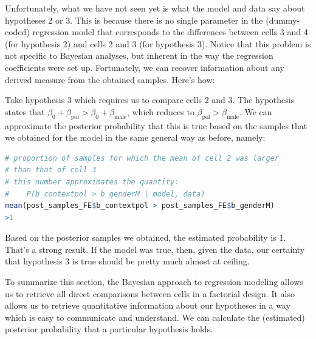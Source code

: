 \documentclass[nobib]{tufte-handout}
\begin{document}
Unfortunately, what we have not seen yet is what the model and data say about hypotheses 2 or 3. This is because there is no single parameter in the (dummy-coded) regression model that corresponds to the differences between cells 3 and 4 (for hypothesis 2) and cells 2 and 3 (for hypothesis 3). Notice that this problem is not specific to Bayesian analyses, but inherent in the way the regression coefficients were set up.
%
%
Fortunately, we can recover information about any derived measure from the obtained samples. Here's how:

Take hypothesis 3 which requires us to compare cells 2 and 3. The hypothesis states that
$\beta_0 + \beta_{\text{pol}} > \beta_0 + \beta_{\text{male}}$, which reduces to
$\beta_{\text{pol}} > \beta_{\text{male}}$. We can approximate the posterior probability that
this is true based on the samples that we obtained for the model in the same general way as
before, namely:

\bigskip

\begin{minipage}[]{1.1\textwidth}
\begin{lstlisting}[language=R]
# proportion of samples for which the mean of cell 2 was larger 
# than that of cell 3 
# this number approximates the quantity:
#    P(b_contextpol > b_genderM | model, data)
mean(post_samples_FE$b_contextpol > post_samples_FE$b_genderM)
>1
\end{lstlisting}
\end{minipage}

Based on the posterior samples we obtained, the estimated probability is 1. That's a strong result. If the model was true, then, given the data, our certainty that hypothesis 3 is true should be pretty much almost at ceiling.

To summarize this section, the Bayesian approach to regression modeling allows us to retrieve all direct comparisons between cells in a factorial design. It also allows us to retrieve quantitative information about our hypotheses in a way which is easy to communicate and understand. We can calculate the (estimated) posterior probability that a particular hypothesis holds. 
\end{document}

